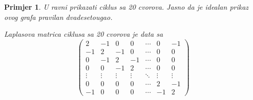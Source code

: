 \documentclass[11pt]{article}
\newtheorem{example}{Primjer}
\begin{document}
	\begin{example}
		U ravni prikazati ciklus sa 20 cvorova. Jasno da je idealan prikaz ovog grafa pravilan dvadesetougao.
        
		Laplasova matrica ciklusa sa 20 cvorova je data sa
		\[
			\begin{pmatrix}
				2 & -1 & 0 & 0 & \cdots & 0 & -1 \\
				-1 & 2 & -1 & 0 & \cdots & 0 & 0 \\
				0 & -1 & 2 & -1 & \cdots & 0 & 0 \\
				0 & 0 & -1 & 2 & \cdots & 0 & 0 \\
				\vdots & \vdots & \vdots & \vdots & \ddots & \vdots & \vdots \\
				0 & 0 & 0 & 0 & \cdots & 2 & -1 \\
				-1 & 0 & 0 & 0 & \cdots & -1 & 2
            \end{pmatrix}	
            \]
            

\end{example}
\end{document}
